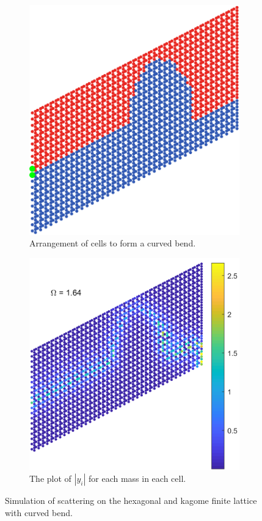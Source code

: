 \begin{figure}
\medskip
\centering
\begin{subfigure}[b]{.5\textwidth}
  \centering
  \includegraphics[width=0.8\linewidth]{imgs/kagomecurvedbendarr.png}
  \caption{Arrangement of cells to form a curved bend.}
  \label{fig:sub1}
\end{subfigure}%
\begin{subfigure}[b]{.5\textwidth}
  \centering
  \includegraphics[width=1\linewidth]{imgs/kagomecurvedbendscat.png}
  \caption{The plot of $|y_i|$ for each mass in each cell.}
  \label{fig:sub2}
\end{subfigure}
\caption{Simulation of scattering on the hexagonal and kagome finite lattice
  with curved bend.}
\label{fig:curvedbend}
\end{figure}

